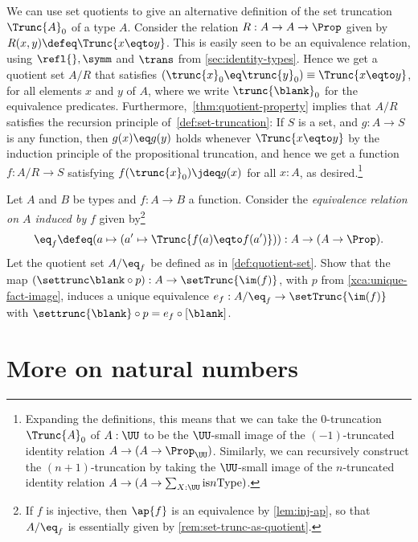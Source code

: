 \begin{remark}\label{rem:set-trunc-as-quotient}
We can use set quotients to give an alternative definition
of the set truncation $\Trunc{A}_0$ of a type $A$.
Consider the relation $R : A \to A \to \Prop$ given by
$R(x,y) \defeq \Trunc {x \eqto y}$.
This is easily seen to be an equivalence relation,
using $\refl{},\symm$ and $\trans$ from \cref{sec:identity-types}.
Hence we get a quotient set $A/R$ that satisfies
$(\trunc{x}_0 \eq \trunc{y}_0) \equiv \Trunc{x\eqto y}$,
for all elements $x$ and $y$ of $A$,
where we write $\trunc{\blank}_0$ for the equivalence predicates.
Furthermore,~\cref{thm:quotient-property} implies that
$A/R$ satisfies the recursion principle of~\cref{def:set-truncation}:
If $S$ is a set, and $g:A\to S$ is any function,
then $g(x) \eq g(y)$ holds whenever $\Trunc{x\eqto y}$
by the induction principle of the propositional truncation,
and hence we get a function $f : A/R \to S$ satisfying
$f(\trunc{x}_0)\jdeq g(x)$ for all $x:A$, as desired.\footnote{%
  Expanding the definitions,
  this means that we can take the $0$-truncation $\Trunc{A}_0$
  of $A:\UU$ to be the $\UU$-small image
  of the $(-1)$-truncated identity relation
  $A \to (A \to \Prop_\UU)$.
  Similarly, we can recursively construct the $(n+1)$-truncation
  by taking the $\UU$-small image
  of the $n$-truncated identity relation
  $A \to (A \to \sum_{X:\UU}\mathrm{is}{n}\mathrm{Type})$.}
\end{remark}

\begin{xca}\label{xca:map-induces-quotient}
Let $A$ and $B$ be types and $f:A\to B$ a function.
Consider the \emph{equivalence relation on $A$ induced by} $f$ 
given by\footnote{%
If $f$ is injective, then $\ap{f}$ is an equivalence by \cref{lem:inj-ap}, 
so that $A/{\eq_f}$ is essentially given by \cref{rem:set-trunc-as-quotient}.} 
\[
{\eq_f} \defeq (a\mapsto(a'\mapsto\Trunc{f(a)\eqto f(a')})) : 
A\to (A\to\Prop).
\]
Let the quotient set $A/{\eq_f}$ be defined as in \cref{def:quotient-set}.
Show that the map $(\settrunc\blank \circ p) : A\to\setTrunc{\im(f)}$,
with $p$ from \cref{xca:unique-fact-image}, induces a unique 
equivalence $e_f:A/{\eq_f}\to\setTrunc{\im(f)}$ 
with $\settrunc{\blank}\circ p = e_f\circ[\blank]$.
\end{xca}

\section{More on natural numbers}
\label{sec:more-on-N}

